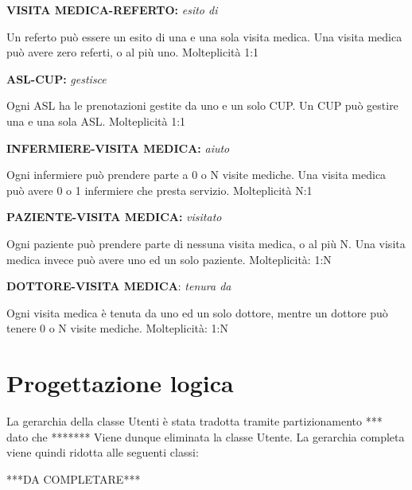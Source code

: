 \documentclass{report}
\begin{document}
\begin{center}
\textbf{VISITA MEDICA-REFERTO:} \textit{esito di}
\end{center}
Un referto può essere un esito di una e una sola visita medica. Una visita medica può avere zero referti, o al più uno.
Molteplicità 1:1

\begin{center}
\textbf{ASL-CUP:} \textit{gestisce}
\end{center}
Ogni ASL ha le prenotazioni gestite da uno e un solo CUP. Un CUP può gestire una e una sola ASL.
Molteplicità 1:1

\begin{center}
\textbf{INFERMIERE-VISITA MEDICA:} \textit{aiuto}
\end{center}
Ogni infermiere può prendere parte a 0 o N visite mediche. Una visita medica può avere 0 o 1 infermiere che presta servizio.
Molteplicità N:1

\begin{center}
\textbf{PAZIENTE-VISITA MEDICA:} \textit{visitato} 
\end{center}
Ogni paziente può prendere parte di nessuna visita medica, o al più N. Una visita medica invece può avere uno ed un solo paziente.
Molteplicità: 1:N

\begin{center}
\textbf{DOTTORE-VISITA MEDICA}: \textit{tenura da }
\end{center}
Ogni visita medica è tenuta da uno ed un solo dottore, mentre un dottore può tenere 0 o N visite mediche.
Molteplicità: 1:N


\section*{Progettazione logica}
La gerarchia della classe Utenti è stata tradotta tramite partizionamento *** dato che *******
Viene dunque eliminata la classe Utente. La gerarchia completa viene quindi ridotta alle seguenti classi:

***DA COMPLETARE***
\end{document}
